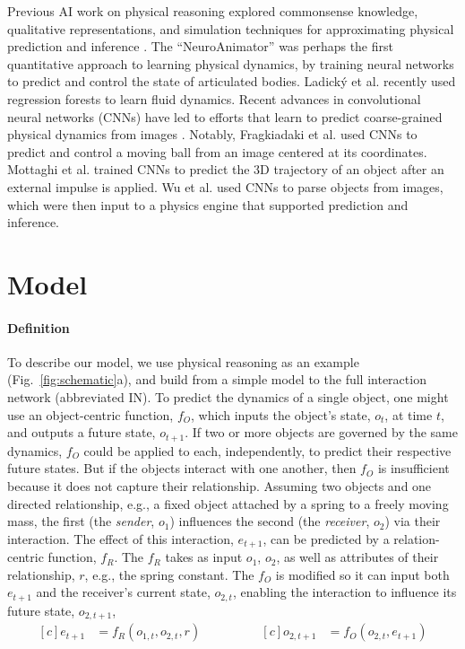 \documentclass{article}
\begin{document}
Previous AI work on physical reasoning explored commonsense knowledge,
qualitative representations, and simulation techniques for
approximating physical prediction and inference
\cite{winston1975psychology,hayes1978naive}
. The
``NeuroAnimator'' \cite{grzeszczuk1998neuroanimator} was perhaps the
first quantitative approach to learning physical dynamics, by training
neural networks to predict and control the state of articulated
bodies.  Ladick\'{y} et al. \cite{jeong2015data} recently used
regression forests to learn fluid dynamics. Recent advances in
convolutional neural networks (CNNs) have led to efforts that learn to
predict coarse-grained physical dynamics from images
\cite{mottaghi2015newtonian,lerer2016learning,li2016fall}. Notably,
Fragkiadaki et al. \cite{fragkiadaki2015learning} used CNNs to predict
and control a moving ball from an image centered at its
coordinates. Mottaghi et al. \cite{mottaghi2016happens} trained CNNs
to predict the 3D trajectory of an object after an external impulse is
applied. Wu et al. \cite{wu2015galileo} used CNNs to parse objects
from images, which were then input to a physics engine that supported
prediction and inference.

\section{Model}
\paragraph{Definition}

To describe our model, we use physical reasoning as an example
(Fig.~\ref{fig:schematic}a), and build from a simple model to the full
interaction network (abbreviated IN). To predict the dynamics of a
single object, one might use an object-centric function, $f_O$, which
inputs the object's state, $o_t$, at time $t$, and outputs a future
state, $o_{t+1}$. If two or more objects are governed by the same
dynamics, $f_O$ could be applied to each, independently, to predict
their respective future states. But if the objects interact with one
another, then $f_O$ is insufficient because it does not capture their
relationship. Assuming two objects and one directed relationship,
e.g., a fixed object attached by a spring to a freely moving mass, the
first (the \textit{sender}, $o_1$) influences the second (the
\textit{receiver}, $o_2$) via their interaction. The effect of this
interaction, $e_{t+1}$, can be predicted by a relation-centric
function, $f_R$. The $f_R$ takes as input $o_1$, $o_2$, as well as
attributes of their relationship, $r$, e.g., the spring constant. The
$f_O$ is modified so it can input both $e_{t+1}$ and the receiver's
current state, $o_{2,t}$, enabling the interaction to influence its
future state, $o_{2,t+1}$,
\begin{equation*}
\begin{aligned}[c]
  e_{t+1} &= f_R(o_{1,t}, o_{2,t}, r)
\end{aligned}
\qquad \qquad
\begin{aligned}[c]
  o_{2,t+1} &= f_O(o_{2,t}, e_{t+1})
\end{aligned}
\end{equation*}
\end{document}
